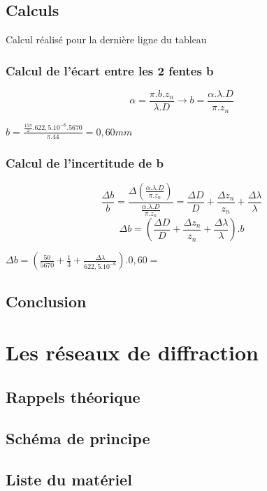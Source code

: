 \documentclass[11pt,a4paper]{report}
\begin{document}
	\section{Calculs}
		Calcul réalisé pour la dernière ligne du tableau
		\subsection{Calcul de l'écart entre les 2 fentes b}
		\begin{equation}
		\alpha = \frac{\pi.b.z_{n}}{\lambda.D} \rightarrow b = \frac{\alpha .\lambda.D }{\pi.z_{n}} 
		\end{equation}
\begin{center}$ b = \frac{\frac{15\pi}{2}.622,5.10^{-6}.5670}{\pi.44} = 0,60 mm$\end{center}
		\subsection{Calcul de l'incertitude de b}
		\begin{equation}
		\frac{\Delta b}{b} = \frac{\Delta\left(\frac{\alpha .\lambda.D }{\pi.z_{n}}\right)}{\frac{\alpha .\lambda.D }{\pi.z_{n}}} 
		= \frac{\Delta D}{D}+\frac{\Delta z_{n}}{z_{n}} + \frac{\Delta \lambda}{\lambda}
		\end{equation}
		\begin{equation}
		\Delta b
		= \left(\frac{\Delta D}{D}+\frac{\Delta z_{n}}{z_{n}} + \frac{\Delta \lambda}{\lambda}\right).b
		\end{equation}
		\begin{center}
		$\Delta b = \left(\frac{50}{5670}+\frac{1}{3} + \frac{\Delta \lambda}{622,5.10^{-6}}\right).0,60 = $
		\end{center}
	\section{Conclusion}
\chapter{Les réseaux de diffraction}
	\section{Rappels théorique}
	\section{Schéma de principe}
	\section{Liste du matériel}
\end{document}

